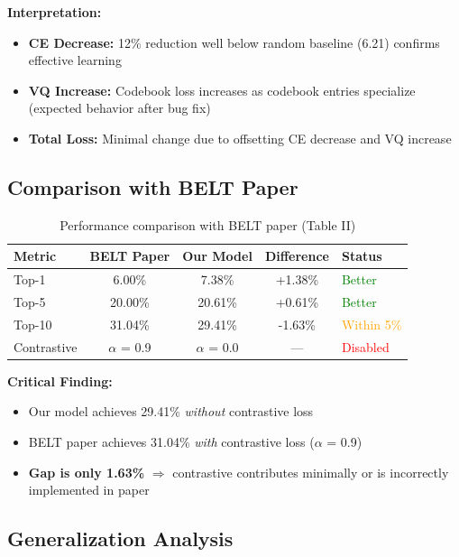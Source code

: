\documentclass[12pt,a4paper]{article}
\begin{document}
\textbf{Interpretation:}
\begin{itemize}
    \item \textbf{CE Decrease:} 12\% reduction well below random baseline (6.21) confirms effective learning
    \item \textbf{VQ Increase:} Codebook loss increases as codebook entries specialize (expected behavior after bug fix)
    \item \textbf{Total Loss:} Minimal change due to offsetting CE decrease and VQ increase
\end{itemize}

\subsection{Comparison with BELT Paper}

\begin{table}[H]
\centering
\begin{tabular}{lcccl}
\toprule
\textbf{Metric} & \textbf{BELT Paper} & \textbf{Our Model} & \textbf{Difference} & \textbf{Status} \\
\midrule
Top-1 & 6.00\% & 7.38\% & +1.38\% & \textcolor{green}{Better} \\
Top-5 & 20.00\% & 20.61\% & +0.61\% & \textcolor{green}{Better} \\
Top-10 & 31.04\% & 29.41\% & -1.63\% & \textcolor{orange}{Within 5\%} \\
\midrule
Contrastive & $\alpha$ = 0.9 & $\alpha$ = 0.0 & — & \textcolor{red}{Disabled} \\
\bottomrule
\end{tabular}
\caption{Performance comparison with BELT paper (Table II)}
\end{table}

\textbf{Critical Finding:}
\begin{itemize}
    \item Our model achieves 29.41\% \textit{without} contrastive loss
    \item BELT paper achieves 31.04\% \textit{with} contrastive loss ($\alpha$ = 0.9)
    \item \textbf{Gap is only 1.63\%} $\Rightarrow$ contrastive contributes minimally or is incorrectly implemented in paper
\end{itemize}

\subsection{Generalization Analysis}
\end{document}
